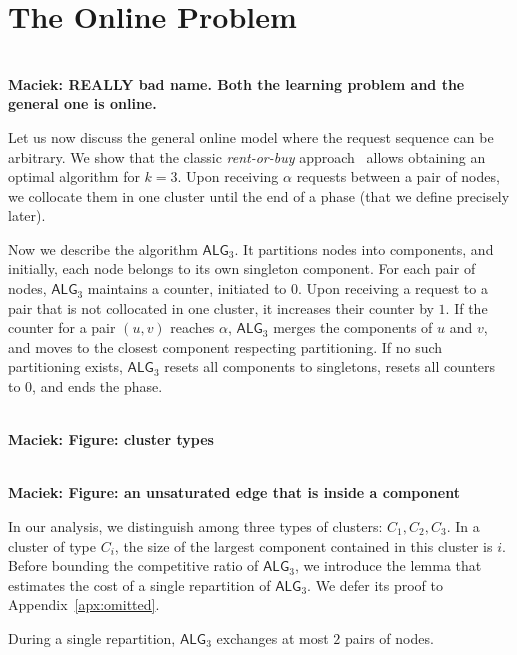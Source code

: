 \documentclass[manuscript,screen=true, review, anonymous]{acmart}
\newcommand{\OPT}{\textsf{OPT}\xspace}
\newcommand{\OBRP}{BRP}
\newcommand{\TAlg}{{\ensuremath{\textsf{ALG}_{3}}}\xspace}
\newcommand\maciek[1]{\color{brown}\textbf{\\ Maciek: #1}\color{black}}
\begin{document}
 
\section{The Online Problem}
\label{sec:k3}

\maciek{REALLY bad name. Both the learning problem and the general one is online.}

Let us now discuss the general online
model where the request sequence
can be arbitrary. We show that the classic \emph{rent-or-buy} approach~\cite{karlin-ski-rental} allows obtaining an optimal algorithm for $k=3$.
Upon receiving $\alpha$ requests between a pair of nodes, we collocate them in one cluster until the end of a phase (that we define precisely later).

Now we describe the algorithm \TAlg.
It partitions nodes into components, and
initially, each node belongs to its own singleton component.
For each pair of nodes, \TAlg maintains a counter, initiated to $0$. 
Upon receiving a request to a pair that is not collocated in one cluster, it increases their counter by $1$.
If the counter for a pair $(u,v)$ reaches $\alpha$, \TAlg merges the components of $u$ and $v$, and moves to the closest component respecting partitioning.
If no such partitioning exists, \TAlg resets all components to singletons, resets all counters to $0$, and ends the phase.



\maciek{Figure: cluster types}

\maciek{Figure: an unsaturated edge that is inside a component}


In our analysis, we distinguish among three types of clusters: $C_1, C_2, C_3$. In a cluster of type $C_i$, the size of the largest component contained in this cluster is $i$.
Before bounding the competitive ratio of \TAlg, we introduce the lemma that estimates the cost of a single repartition of \TAlg. We defer its proof to Appendix~\ref{apx:omitted}.

\begin{lemma}
  \label{lem:1req}
  During a single repartition, \TAlg exchanges at most $2$ pairs of nodes.
\end{lemma}
\end{document}
